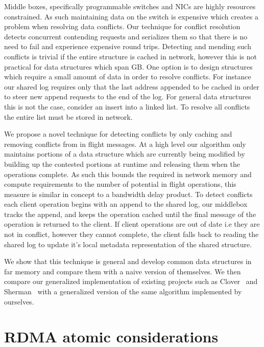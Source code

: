 Middle boxes, specifically programmable switches and NICs are highly resources
constrained. As such maintaining data on the switch is expensive which creates a
problem when resolving data conflicts. Our technique for conflict resolution
detects concurrent contending requests and serializes them so that there is no
need to fail and experience expensive round trips.  Detecting and mending such
conflicts is trivial if the entire structure is cached in network, however this
is not practical for data structures which span GB. One option is to design
structures which require a small amount of data in order to resolve conflicts.
For instance our shared log requires only that the last address appended to be
cached in order to steer new append requests to the end of the log. For general
data structures this is not the case, consider an insert into a linked list. To
resolve all conflicts the entire list must be stored in network.

We propose a novel technique for detecting conflicts by only caching and
removing conflicts from in flight messages. At a high level our algorithm only
maintains portions of a data structure which are currently being modified by
building up the contested portions at runtime and releasing them when the
operations complete. As such this bounds the required in network memory and
compute requirements to the number of potential in flight operations, this
measure is similar in concept to a bandwidth delay product. To detect conflicts
each client operation begins with an append to the shared log, our middlebox
tracks the append, and keeps the operation cached until the final message of the
operation is returned to the client. If client operations are out of date i.e
they are not in conflict, however they cannot complete, the client falls back to
reading the shared log to update it's local metadata representation of the
shared structure.

We show that this technique is general and develop common data structures in far
memory and compare them with a naive version of themselves. We then compare our
generalized implementation of existing projects such as Clover~\cite{clover} and
Sherman~\cite{sherman} with a generalized version of the same algorithm
implemented by ourselves.

\section{RDMA atomic considerations}

